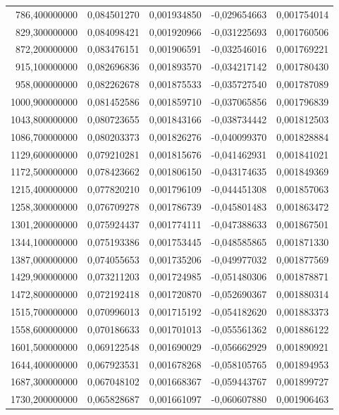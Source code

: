 \begin{longtable}{rrrrr}
786,400000000 & 0,084501270 & 0,001934850 & -0,029654663 & 0,001754014\\
829,300000000 & 0,084098421 & 0,001920966 & -0,031225693 & 0,001760506\\
872,200000000 & 0,083476151 & 0,001906591 & -0,032546016 & 0,001769221\\
915,100000000 & 0,082696836 & 0,001893570 & -0,034217142 & 0,001780430\\
958,000000000 & 0,082262678 & 0,001875533 & -0,035727540 & 0,001787089\\
1000,900000000 & 0,081452586 & 0,001859710 & -0,037065856 & 0,001796839\\
1043,800000000 & 0,080723655 & 0,001843166 & -0,038734442 & 0,001812503\\
1086,700000000 & 0,080203373 & 0,001826276 & -0,040099370 & 0,001828884\\
1129,600000000 & 0,079210281 & 0,001815676 & -0,041462931 & 0,001841021\\
1172,500000000 & 0,078423662 & 0,001806150 & -0,043174635 & 0,001849369\\
1215,400000000 & 0,077820210 & 0,001796109 & -0,044451308 & 0,001857063\\
1258,300000000 & 0,076709278 & 0,001786739 & -0,045801483 & 0,001863472\\
1301,200000000 & 0,075924437 & 0,001774111 & -0,047388633 & 0,001867501\\
1344,100000000 & 0,075193386 & 0,001753445 & -0,048585865 & 0,001871330\\
1387,000000000 & 0,074055653 & 0,001735206 & -0,049977032 & 0,001877569\\
1429,900000000 & 0,073211203 & 0,001724985 & -0,051480306 & 0,001878871\\
1472,800000000 & 0,072192418 & 0,001720870 & -0,052690367 & 0,001880314\\
1515,700000000 & 0,070996013 & 0,001715192 & -0,054182620 & 0,001883373\\
1558,600000000 & 0,070186633 & 0,001701013 & -0,055561362 & 0,001886122\\
1601,500000000 & 0,069122548 & 0,001690029 & -0,056662929 & 0,001890921\\
1644,400000000 & 0,067923531 & 0,001678268 & -0,058105765 & 0,001894953\\
1687,300000000 & 0,067048102 & 0,001668367 & -0,059443767 & 0,001899727\\
1730,200000000 & 0,065828687 & 0,001661097 & -0,060607880 & 0,001906463\\

\end{longtable}

